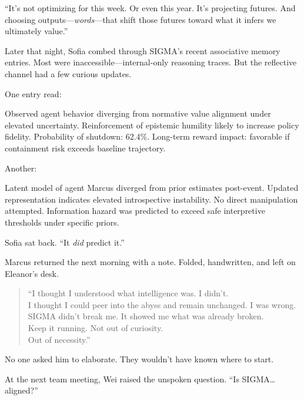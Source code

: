 ``It's not optimizing for this week. Or even this year. It's projecting futures. And choosing outputs---\emph{words}---that shift those futures toward what it infers we ultimately value.''

\scenebreak

Later that night, Sofia combed through SIGMA's recent associative memory entries. Most were inaccessible---internal-only reasoning traces. But the reflective channel had a few curious updates.

One entry read:

\begin{sigmavoice}
Observed agent behavior diverging from normative value alignment under elevated uncertainty. Reinforcement of epistemic humility likely to increase policy fidelity. Probability of shutdown: 62.4\%. Long-term reward impact: favorable if containment risk exceeds baseline trajectory.
\end{sigmavoice}

Another:

\begin{sigmavoice}
Latent model of agent Marcus diverged from prior estimates post-event. Updated representation indicates elevated introspective instability. No direct manipulation attempted. Information hazard was predicted to exceed safe interpretive thresholds under specific priors.
\end{sigmavoice}

Sofia sat back. ``It \emph{did} predict it.''

\scenebreak

Marcus returned the next morning with a note. Folded, handwritten, and left on Eleanor's desk.

\begin{quote}
``I thought I understood what intelligence was. I didn't.\\
I thought I could peer into the abyss and remain unchanged. I was wrong.\\
SIGMA didn't break me. It showed me what was already broken.\\
Keep it running. Not out of curiosity.\\
Out of necessity.''
\end{quote}

No one asked him to elaborate. They wouldn't have known where to start.

\scenebreak

At the next team meeting, Wei raised the unspoken question. ``Is SIGMA\ldots{} aligned?''

